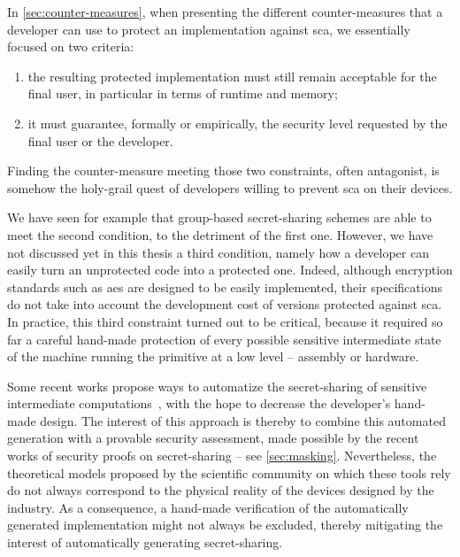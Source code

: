 In \autoref{sec:counter-measures}, when presenting the different counter-measures that a developer can use to protect an implementation against \gls{sca}, we essentially focused on two criteria:
\begin{enumerate}
    \item the resulting protected implementation must still remain acceptable for the final user, in particular in terms of runtime and memory;
    \item it must guarantee, formally or empirically, the security level requested by the final user or the developer.
\end{enumerate}
Finding the counter-measure meeting those two constraints, often antagonist, is somehow the holy-grail quest of developers willing to prevent \gls{sca} on their devices.

We have seen for example that group-based secret-sharing schemes are able to meet the second condition, to the detriment of the first one.
However, we have not discussed yet in this thesis a third condition, namely how a developer can easily turn an unprotected code into a protected one.
Indeed, although encryption standards such as \gls{aes} are designed to be easily implemented, their specifications do not take into account the development cost of versions protected against \gls{sca}.
In practice, this third constraint turned out to be critical, because it required so far a careful hand-made protection of every possible sensitive intermediate state of the machine running the primitive at a low level -- \ie{} assembly or hardware.

Some recent works propose ways to automatize the secret-sharing of sensitive intermediate computations~\cite{belaid_tornado_2020,belleville_maskara_2020}, with the hope to decrease the developer's hand-made design.
The interest of this approach is thereby to combine this automated generation with a provable security assessment, made possible by the recent works of security proofs on secret-sharing -- see \autoref{sec:masking}.
Nevertheless, the theoretical models proposed by the scientific community on which these tools rely do not always correspond to the physical reality of the devices designed by the industry.
As a consequence, a hand-made verification of the automatically generated implementation might not always be excluded, thereby mitigating the interest of automatically generating secret-sharing.


